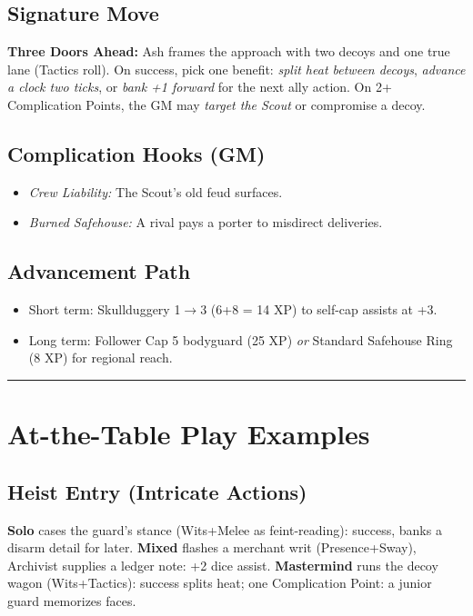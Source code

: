 \documentclass[12pt]{book}
\begin{document}
\subsection*{Signature Move}
\textbf{Three Doors Ahead:} Ash frames the approach with two decoys and one true lane (Tactics roll). On success, pick one benefit: \emph{split heat between decoys}, \emph{advance a clock two ticks}, or \emph{bank +1 forward} for the next ally action. On 2+ Complication Points, the GM may \emph{target the Scout} or compromise a decoy.

\subsection*{Complication Hooks (GM)}
\begin{itemize}
  \item \emph{Crew Liability:} The Scout’s old feud surfaces.
  \item \emph{Burned Safehouse:} A rival pays a porter to misdirect deliveries.
\end{itemize}

\subsection*{Advancement Path}
\begin{itemize}
  \item Short term: Skullduggery 1$\rightarrow$3 (6+8 = 14 XP) to self-cap assists at +3.
  \item Long term: Follower Cap 5 bodyguard (25 XP) \emph{or} Standard Safehouse Ring (8 XP) for regional reach.
\end{itemize}

\bigskip
\hrule
\bigskip

\section{At-the-Table Play Examples}

\subsection*{Heist Entry (Intricate Actions)}
\textbf{Solo} cases the guard’s stance (Wits+Melee as feint-reading): success, banks a disarm detail for later.  
\textbf{Mixed} flashes a merchant writ (Presence+Sway), Archivist supplies a ledger note: +2 dice assist.  
\textbf{Mastermind} runs the decoy wagon (Wits+Tactics): success splits heat; one Complication Point: a junior guard memorizes faces.
\end{document}
